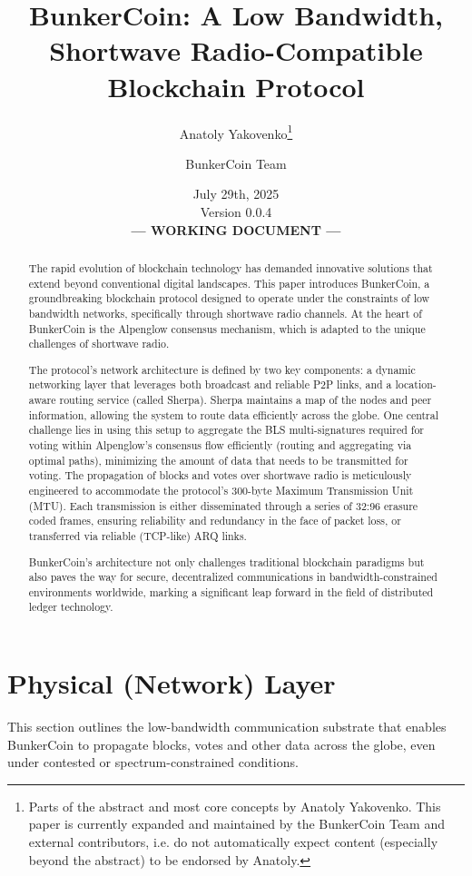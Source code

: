 \documentclass{article}
\title{BunkerCoin: A Low Bandwidth, Shortwave Radio-Compatible Blockchain Protocol}
\author{Anatoly Yakovenko\thanks{Parts of the abstract and most core concepts by Anatoly Yakovenko. This paper is currently expanded and maintained by the BunkerCoin Team and external contributors, i.e. do not automatically expect content (especially beyond the abstract) to be endorsed by Anatoly.} \and BunkerCoin Team}
\date{July 29th, 2025\\Version 0.0.4 \\[1em] \textbf{--- WORKING DOCUMENT ---}}
\begin{document}
\maketitle

\begin{abstract}
The rapid evolution of blockchain technology has demanded innovative solutions that extend beyond conventional digital landscapes. This paper introduces BunkerCoin, a groundbreaking blockchain protocol designed to operate under the constraints of low bandwidth networks, specifically through shortwave radio channels. At the heart of BunkerCoin is the Alpenglow consensus mechanism, which is adapted to the unique challenges of shortwave radio.

The protocol's network architecture is defined by two key components: a dynamic networking layer that leverages both broadcast and reliable P2P links, and a location-aware routing service (called Sherpa). Sherpa maintains a map of the nodes and peer information, allowing the system to route data efficiently across the globe. One central challenge lies in using this setup to aggregate the BLS multi-signatures required for voting within Alpenglow's consensus flow efficiently (routing and aggregating via optimal paths), minimizing the amount of data that needs to be transmitted for voting. The propagation of blocks and votes over shortwave radio is meticulously engineered to accommodate the protocol's 300-byte Maximum Transmission Unit (MTU). Each transmission is either disseminated through a series of 32:96 erasure coded frames, ensuring reliability and redundancy in the face of packet loss, or transferred via reliable  (TCP-like) ARQ links.

BunkerCoin's architecture not only challenges traditional blockchain paradigms but also paves the way for secure, decentralized communications in bandwidth-constrained environments worldwide, marking a significant leap forward in the field of distributed ledger technology.
\end{abstract}

\section{Physical (Network) Layer}
\label{sec:physical}

This section outlines the low-bandwidth communication substrate that enables BunkerCoin to propagate blocks, votes and other data across the globe, even under contested or spectrum-constrained conditions.
\end{document}
